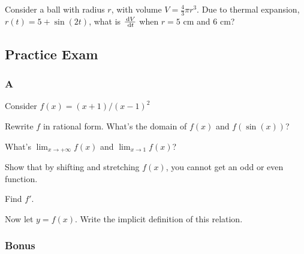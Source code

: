 \documentclass[Calculus 1 Recitation.tex]{subfiles}
\begin{document}
\begin{myleftlinebox}
	Consider a ball with radius $r$, with volume $V=\frac{4}{3}\pi r^3$. Due to thermal expansion, $r(t)=5+\sin(2t)$, what is $\frac{\,\mathrm{d} V}{\,\mathrm{d} t}$ when $r=5$ cm and $6$ cm?
	\tcblower
	\vspace{3em}
\end{myleftlinebox}

\newpage

\subsection{Practice Exam}

\subsubsection*{A}

Consider $f(x)=(x+1)/(x-1)^2$

\begin{myleftlinebox}
	Rewrite $f$ in rational form. What's the domain of $f(x)$ and $f(\sin(x))$?
	\tcblower
	\vspace{2em}
\end{myleftlinebox}

\begin{myleftlinebox}
	What's $\lim_{x\to +\infty} f(x)$ and $\lim_{x\to 1}f(x)$?
	\tcblower
	\vspace{2em}
\end{myleftlinebox}

\begin{myleftlinebox}
	Show that by shifting and stretching $f(x)$, you cannot get an odd or even function.
	\tcblower
	\vspace{2em}
\end{myleftlinebox}

\begin{myleftlinebox}
	Find $f'$.
	\tcblower
	\vspace{2em}
\end{myleftlinebox}

\begin{myleftlinebox}
	Now let $y=f(x)$. Write the implicit definition of this relation.
	\tcblower
	\vspace{2em}
\end{myleftlinebox}

\subsubsection*{Bonus}
\end{document}
